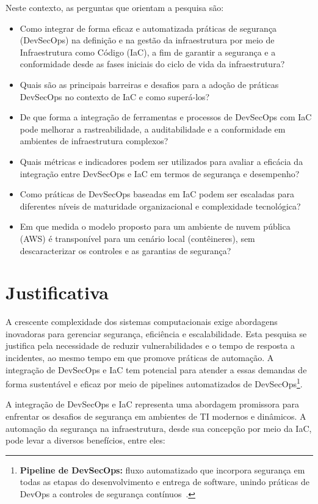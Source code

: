Neste contexto, as perguntas que orientam a pesquisa são:

\begin{itemize}
    \item Como integrar de forma eficaz e automatizada práticas de segurança (DevSecOps) na definição e na gestão da infraestrutura por meio de Infraestrutura como Código (IaC), a fim de garantir a segurança e a conformidade desde as fases iniciais do ciclo de vida da infraestrutura?
    \item Quais são as principais barreiras e desafios para a adoção de práticas DevSecOps no contexto de IaC e como superá-los?
    \item De que forma a integração de ferramentas e processos de DevSecOps com IaC pode melhorar a rastreabilidade, a auditabilidade e a conformidade em ambientes de infraestrutura complexos?
    \item Quais métricas e indicadores podem ser utilizados para avaliar a eficácia da integração entre DevSecOps e IaC em termos de segurança e desempenho?
    \item Como práticas de DevSecOps baseadas em IaC podem ser escaladas para diferentes níveis de maturidade organizacional e complexidade tecnológica?
    \item Em que medida o modelo proposto para um ambiente de nuvem pública (AWS) é transponível para um cenário local (contêineres), sem descaracterizar os controles e as garantias de segurança?
\end{itemize}

\section{Justificativa}

A crescente complexidade dos sistemas computacionais exige abordagens inovadoras para gerenciar segurança, eficiência e escalabilidade. Esta pesquisa se justifica pela necessidade de reduzir vulnerabilidades e o tempo de resposta a incidentes, ao mesmo tempo em que promove práticas de automação. A integração de DevSecOps e IaC tem potencial para atender a essas demandas de forma sustentável e eficaz por meio de pipelines automatizados de DevSecOps\footnote{\textbf{Pipeline de DevSecOps:} fluxo automatizado que incorpora segurança em todas as etapas do desenvolvimento e entrega de software, unindo práticas de DevOps a controles de segurança contínuos~.}.

A integração de DevSecOps e IaC representa uma abordagem promissora para enfrentar os desafios de segurança em ambientes de TI modernos e dinâmicos. A automação da segurança na infraestrutura, desde sua concepção por meio da IaC, pode levar a diversos benefícios, entre eles:

